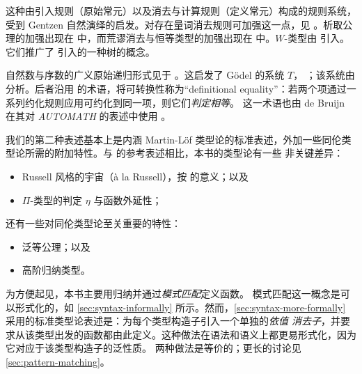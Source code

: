 \sectionNotes\label{subsec:general-remarks}


这种由引入规则（原始常元）以及消去与计算规则（定义常元）构成的规则系统，受到 Gentzen 自然演绎的启发。对存在量词消去规则可加强这一点，见 \cite{howard:pat}。析取公理的加强出现在 \cite{Martin-Lof-1972} 中，而荒谬消去与恒等类型的加强出现在 \cite{Martin-Lof-1973} 中。$W$-类型由 \cite{Martin-Lof-1979} 引入。它们推广了 \cite{Tait-1968} 引入的一种树的概念。
%


自然数与序数的广义原始递归形式见于 \cite{Hilbert-1925}。这启发了 G\"odel 的系统 $T$，
\cite{Goedel-T-1958}；该系统由 \cite{Tait-1966} 分析。后者沿用 \cite{Goedel-T-1958} 的术语，将可转换性称为“definitional equality”：若两个项通过一系列约化规则应用可约化到同一项，则它们\emph{判定相等}。
这一术语也由 de Bruijn 在其对 \emph{AUTOMATH} 的表述中使用 \cite{deBruijn-1973}。

我们的第二种表述基本上是内涵 Martin-L\"{o}f 类型论的标准表述，外加一些同伦类型论所需的附加特性。与 \cite{hofmann:syntax-and-semantics} 的参考表述相比，本书的类型论有一些
非关键差异：
%
\begin{itemize}
\item Russell 风格的宇宙（\`{a} la Russell），按
\cite{martin-lof:bibliopolis} 的意义；以及
\item $\Pi$-类型的判定 $\eta$ 与函数外延性；
\end{itemize}
还有一些对同伦类型论至关重要的特性：
\begin{itemize}
\item 泛等公理；以及
\item 高阶归纳类型。
\end{itemize}
%
为方便起见，本书主要用归纳并通过\emph{模式匹配}定义函数。
%
%
模式匹配这一概念是可以形式化的，如 \cref{sec:syntax-informally} 所示。然而，\cref{sec:syntax-more-formally} 采用的标准类型论表述是：为每个类型构造子引入一个单独的\emph{依值
消去子}，并要求从该类型出发的函数都由此定义。这种做法在语法和语义上都更易形式化，因为它对应于该类型构造子的泛性质。
两种做法是等价的；更长的讨论见 \cref{sec:pattern-matching}。

%
%


